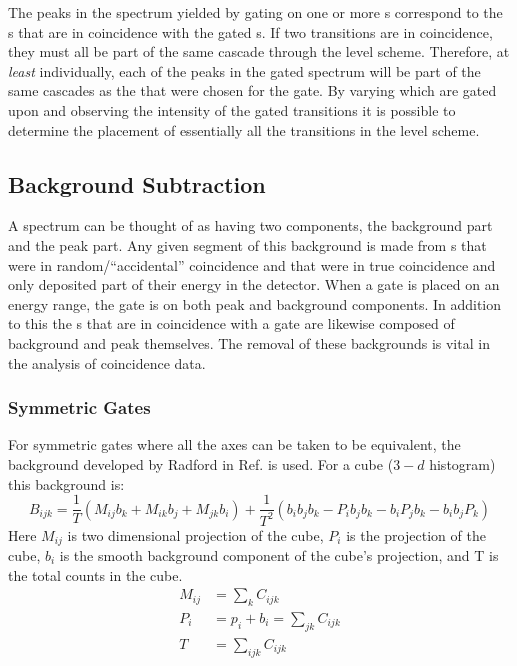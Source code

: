 The peaks in the spectrum yielded by gating on one or more \gr{}s correspond to the \gr{}s that are in coincidence with the gated \gr{}s. If two transitions are in coincidence, they must all be part of the same cascade through the level scheme. Therefore, at \emph{least} individually, each of the peaks in the gated spectrum will be part of the same cascades as the \gr{} that were chosen for the gate. By varying which \gr{} are gated upon and observing the intensity of the gated transitions it is possible to determine the placement of essentially all the \gr{} transitions in the level scheme.

\subsection{Background Subtraction}
\label{ssec:exp-pr-data-proc-bg-sub}
A spectrum can be thought of as having two components, the background part and the peak part. Any given segment of this background is made from \gr{}s that were in random/``accidental'' coincidence and \gr{} that were in true coincidence and only deposited part of their energy in the detector. When a gate is placed on an energy range, the gate is on both peak and background components. In addition to this the \gr{}s that are in coincidence with a gate are likewise composed of background and peak themselves. The removal of these backgrounds is vital in the analysis of \gr{} coincidence data.

\subsubsection{Symmetric Gates}
\label{sssec:exp-pr-data-proc-bg-sub-sym}
For symmetric gates where all the axes can be taken to be equivalent, the background developed by Radford in Ref. \cite{symBGSub} is used. For a cube ($3-d$ histogram) this background is:
\begin{equation}
\label{eqn:chp3-cube-bg}
B_{ijk}=\frac{1}{T}\left(M_{ij}b_{k} + M_{ik}b_{j} + M_{jk}b_{i}\right) + \frac{1}{T^{2}}\left(b_{i}b_{j}b_{k} - P_{i}b_{j}b_{k} - b_{i}P_{j}b_{k} - b_{i}b_{j}P_{k}\right)
\end{equation} 
Here $M_{ij}$ is two dimensional projection of the cube, $P_{i}$ is the projection of the cube, $b_{i}$ is the smooth background component of the cube's projection, and T is the total counts in the cube.
\begin{align}
\label{eqn:chp3-cube-bg-defs}
M_{ij} &= \sum\limits_{k}^{}C_{ijk} \\
P_i &= p_i + b_i = \sum\limits_{jk}^{}C_{ijk}\\
T &= \sum\limits_{ijk}^{}C_{ijk}
\end{align}

